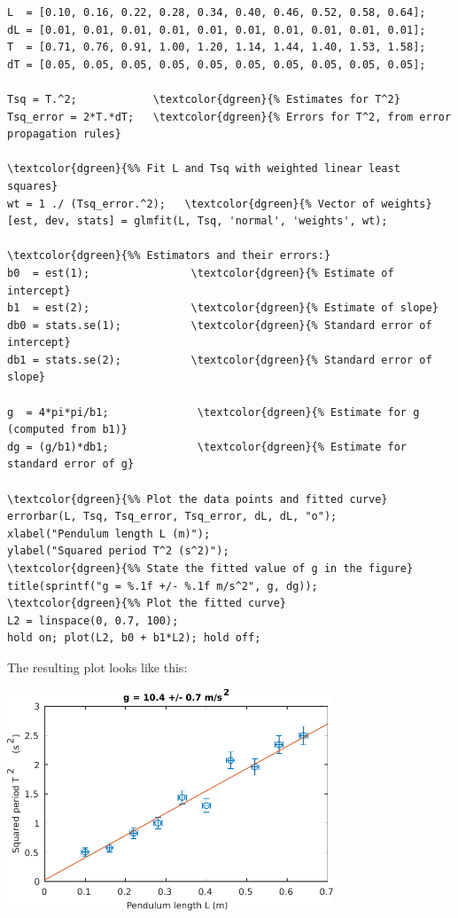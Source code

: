 \documentclass[11pt,a4paper]{article}
\begin{document}
\begin{Verbatim}[frame=single,baselinestretch=1,fontsize=\small,commandchars=\\\{\}]
L  = [0.10, 0.16, 0.22, 0.28, 0.34, 0.40, 0.46, 0.52, 0.58, 0.64];
dL = [0.01, 0.01, 0.01, 0.01, 0.01, 0.01, 0.01, 0.01, 0.01, 0.01];
T  = [0.71, 0.76, 0.91, 1.00, 1.20, 1.14, 1.44, 1.40, 1.53, 1.58];
dT = [0.05, 0.05, 0.05, 0.05, 0.05, 0.05, 0.05, 0.05, 0.05, 0.05];

Tsq = T.^2;            \textcolor{dgreen}{% Estimates for T^2}
Tsq_error = 2*T.*dT;   \textcolor{dgreen}{% Errors for T^2, from error propagation rules}

\textcolor{dgreen}{%% Fit L and Tsq with weighted linear least squares}
wt = 1 ./ (Tsq_error.^2);   \textcolor{dgreen}{% Vector of weights}
[est, dev, stats] = glmfit(L, Tsq, 'normal', 'weights', wt);

\textcolor{dgreen}{%% Estimators and their errors:}
b0  = est(1);                \textcolor{dgreen}{% Estimate of intercept}
b1  = est(2);                \textcolor{dgreen}{% Estimate of slope}
db0 = stats.se(1);           \textcolor{dgreen}{% Standard error of intercept}
db1 = stats.se(2);           \textcolor{dgreen}{% Standard error of slope}

g  = 4*pi*pi/b1;              \textcolor{dgreen}{% Estimate for g (computed from b1)}
dg = (g/b1)*db1;              \textcolor{dgreen}{% Estimate for standard error of g}

\textcolor{dgreen}{%% Plot the data points and fitted curve}
errorbar(L, Tsq, Tsq_error, Tsq_error, dL, dL, "o");
xlabel("Pendulum length L (m)");
ylabel("Squared period T^2 (s^2)");
\textcolor{dgreen}{%% State the fitted value of g in the figure}
title(sprintf("g = %.1f +/- %.1f m/s^2", g, dg));
\textcolor{dgreen}{%% Plot the fitted curve}
L2 = linspace(0, 0.7, 100);
hold on; plot(L2, b0 + b1*L2); hold off;
\end{Verbatim}
The resulting plot looks like this:
\begin{center}
  \includegraphics[width=0.73\textwidth]{errormatlab.pdf}
\end{center}
\end{document}
